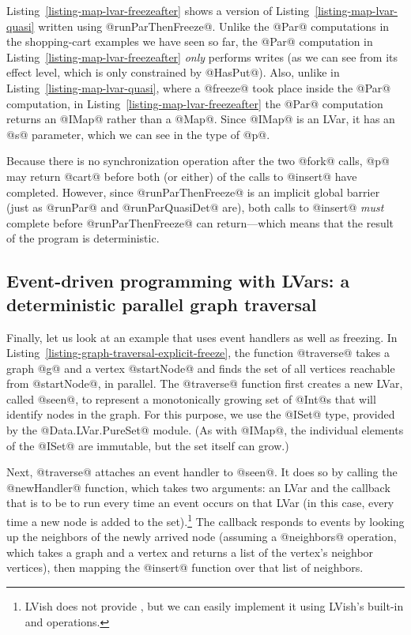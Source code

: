Listing~\ref{listing-map-lvar-freezeafter} shows a version of
Listing~\ref{listing-map-lvar-quasi} written using @runParThenFreeze@.
Unlike the @Par@ computations in the shopping-cart examples we have
seen so far, the @Par@ computation in
Listing~\ref{listing-map-lvar-freezeafter} \emph{only} performs writes
(as we can see from its effect level, which is only constrained by
@HasPut@).  Also, unlike in Listing~\ref{listing-map-lvar-quasi},
where a @freeze@ took place inside the @Par@ computation, in
Listing~\ref{listing-map-lvar-freezeafter} the @Par@ computation
returns an @IMap@ rather than a @Map@.  Since @IMap@ is an LVar, it
has an @s@ parameter, which we can see in the type of @p@.

Because there is no synchronization operation after the two @fork@
calls, @p@ may return @cart@ before both (or either) of the calls to
@insert@ have completed.  However, since @runParThenFreeze@ is an
implicit global barrier (just as @runPar@ and @runParQuasiDet@ are),
both calls to @insert@ \emph{must} complete before @runParThenFreeze@
can return---which means that the result of the program is
deterministic.

\subsection{Event-driven programming with LVars: a deterministic parallel graph traversal}\label{subsection:lvish-parallel-graph-traversal}

Finally, let us look at an example that uses event handlers as well as
freezing.  In Listing~\ref{listing-graph-traversal-explicit-freeze},
the function @traverse@ takes a graph @g@ and a vertex @startNode@ and
finds the set of all vertices reachable from @startNode@, in parallel.
The @traverse@ function first creates a new LVar, called @seen@, to
represent a monotonically growing set of @Int@s that will identify
nodes in the graph.  For this purpose, we use the @ISet@ type,
provided by the @Data.LVar.PureSet@ module.  (As with @IMap@, the
individual elements of the @ISet@ are immutable, but the set itself
can grow.)

\singlespacing

\doublespacing

Next, @traverse@ attaches an event handler to @seen@.  It does so by
calling the @newHandler@ function, which takes two arguments: an LVar
and the callback that is to be to run every time an event occurs on
that LVar (in this case, every time a new node is added to the
set).\footnote{LVish does not provide , but we can
  easily implement it using LVish's built-in  and
   operations.}  The callback responds to events by
looking up the neighbors of the newly arrived node (assuming a
@neighbors@ operation, which takes a graph and a vertex and returns a
list of the vertex's neighbor vertices), then mapping the @insert@
function over that list of neighbors.

